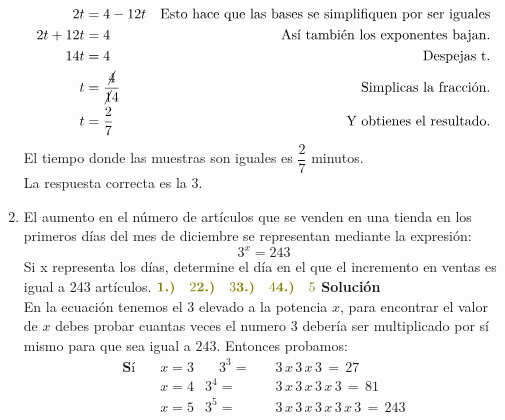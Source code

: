 \documentclass[11pt, a4paper]{article} %
\theoremstyle{dotlessP}
\theoremstyle{dotlessS}
\begin{document}
\begin{enumerate}[label=\color{dg}\theenumi.]
\begin{align*}
\\
2t  &= 4 - 12t &\text{Esto hace que las bases se simplifiquen por ser iguales}  
\\
2t +  12t&= 4 &\text{Así también los exponentes bajan.}  
\\
14t&= 4  &\text{Despejas t.}  
\\
t &= \displaystyle\frac{\cancel 4}{\cancel 14} &\text{Simplicas la fracción.}  
\\
t &= \dfrac{2}{7} &\text{Y obtienes el resultado.}  
\end{align*}
El tiempo donde las muestras son iguales es $\dfrac{2}{7}$ minutos.
\\
{\color{dh} La respuesta correcta es la 3.}
\\
\item {\color{db} El aumento en el número de artículos que se venden en una tienda en los primeros días del mes de diciembre se representan mediante la expresión: 
\[
3^x = 243
\]
Si x representa los días, determine el día en el que el incremento en ventas es igual a 243 artículos.}
        \(
\vspace{1\baselineskip} \\ 	
     {\color{dh} \textbf{1.)} \quad 2} \vspace{1\baselineskip} \\ 	
     {\color{dh} \textbf{2.)} \quad 3} \vspace{1\baselineskip} \\ 	
     {\color{dh} \textbf{3.)} \quad 4} \vspace{1\baselineskip} \\ 	
     {\color{dh} \textbf{4.)} \quad 5}   \vspace{1\baselineskip} \\ 	
      \)
        \textbf{Solución} \\
En la ecuación tenemos el 3 elevado a la potencia \( x \), para encontrar el valor de \( x \) debes probar cuantas veces el numero 3 debería ser multiplicado por sí mismo para que sea igual a \( 243\).
Entonces probamos:
\begin{align*}
\textbf{Sí} \quad & x = 3 &\quad 3^3 = &\quad 3\, x\, 3\, x\, 3\, =\, 27 \\
            & x = 4 & 3^4 = &\quad 3\, x\, 3\, x\, 3\, x\, 3\, =\, 81\\
            & x = 5 & 3^5 = &\quad 3\, x\, 3\, x\, 3\, x\, 3\, x\, 3\, =\, 243 
\end{align*}


\end{enumerate}
\end{document}
